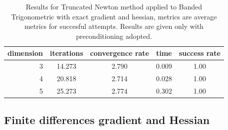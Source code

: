 \begin{table}
\centering
\caption{Results for Truncated Newton method applied to Banded Trigonometric with exact gradient and hessian, metrics are average metrics for succesful attempts. Results are given only with preconditioning adopted.}
\label{tab:Truncated_Newton_Banded_Trigonometric_exact}
\begin{tabular}{r|cc|cc}
\toprule
    dimension & iterations & convergence rate & time & success rate \\
\midrule
3 & 14.273 & 2.790 & 0.009 & 1.00 \\
4 & 20.818 & 2.714 & 0.028 & 1.00 \\
5 & 25.273 & 2.774 & 0.302 & 1.00 \\
\bottomrule
\end{tabular}
\end{table}

\subsection{Finite differences gradient and Hessian}

